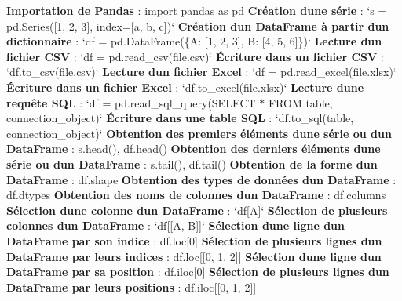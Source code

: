 {\bfseries Importation de Pandas} \+: {\ttfamily import pandas as pd} {\bfseries Création d\textquotesingle{}une série} \+: `s = pd.\+Series(\mbox{[}1, 2, 3\mbox{]}, index=\mbox{[}\textquotesingle{}a\textquotesingle{}, \textquotesingle{}b\textquotesingle{}, \textquotesingle{}c\textquotesingle{}\mbox{]})` {\bfseries Création d\textquotesingle{}un Data\+Frame à partir d\textquotesingle{}un dictionnaire} \+: `df = pd.\+Data\+Frame(\{\textquotesingle{}A\textquotesingle{}\+: \mbox{[}1, 2, 3\mbox{]}, \textquotesingle{}B\textquotesingle{}\+: \mbox{[}4, 5, 6\mbox{]}\})` {\bfseries Lecture d\textquotesingle{}un fichier C\+SV} \+: `df = pd.\+read\+\_\+csv(\textquotesingle{}file.\+csv\textquotesingle{})` {\bfseries Écriture dans un fichier C\+SV} \+: `df.to\+\_\+csv(\textquotesingle{}file.\+csv\textquotesingle{})` {\bfseries Lecture d\textquotesingle{}un fichier Excel} \+: `df = pd.\+read\+\_\+excel(\textquotesingle{}file.\+xlsx\textquotesingle{})` {\bfseries Écriture dans un fichier Excel} \+: `df.to\+\_\+excel(\textquotesingle{}file.\+xlsx\textquotesingle{})` {\bfseries Lecture d\textquotesingle{}une requête S\+QL} \+: `df = pd.\+read\+\_\+sql\+\_\+query(\textquotesingle{}S\+E\+L\+E\+CT $\ast$ F\+R\+OM table\textquotesingle{}, connection\+\_\+object)` {\bfseries Écriture dans une table S\+QL} \+: `df.to\+\_\+sql(\textquotesingle{}table\textquotesingle{}, connection\+\_\+object)` {\bfseries Obtention des premiers éléments d\textquotesingle{}une série ou d\textquotesingle{}un Data\+Frame} \+: {\ttfamily s.\+head()}, {\ttfamily df.\+head()} {\bfseries Obtention des derniers éléments d\textquotesingle{}une série ou d\textquotesingle{}un Data\+Frame} \+: {\ttfamily s.\+tail()}, {\ttfamily df.\+tail()} {\bfseries Obtention de la forme d\textquotesingle{}un Data\+Frame} \+: {\ttfamily df.\+shape} {\bfseries Obtention des types de données d\textquotesingle{}un Data\+Frame} \+: {\ttfamily df.\+dtypes} {\bfseries Obtention des noms de colonnes d\textquotesingle{}un Data\+Frame} \+: {\ttfamily df.\+columns} {\bfseries Sélection d\textquotesingle{}une colonne d\textquotesingle{}un Data\+Frame} \+: `df\mbox{[}\textquotesingle{}A\textquotesingle{}\mbox{]}` {\bfseries Sélection de plusieurs colonnes d\textquotesingle{}un Data\+Frame} \+: `df\mbox{[}\mbox{[}\textquotesingle{}A\textquotesingle{}, \textquotesingle{}B\textquotesingle{}\mbox{]}\mbox{]}` {\bfseries Sélection d\textquotesingle{}une ligne d\textquotesingle{}un Data\+Frame par son indice} \+: {\ttfamily df.\+loc\mbox{[}0\mbox{]}} {\bfseries Sélection de plusieurs lignes d\textquotesingle{}un Data\+Frame par leurs indices} \+: {\ttfamily df.\+loc\mbox{[}\mbox{[}0, 1, 2\mbox{]}\mbox{]}} {\bfseries Sélection d\textquotesingle{}une ligne d\textquotesingle{}un Data\+Frame par sa position} \+: {\ttfamily df.\+iloc\mbox{[}0\mbox{]}} {\bfseries Sélection de plusieurs lignes d\textquotesingle{}un Data\+Frame par leurs positions} \+: {\ttfamily df.\+iloc\mbox{[}\mbox{[}0, 1, 2\mbox{]}\mbox{]}} 